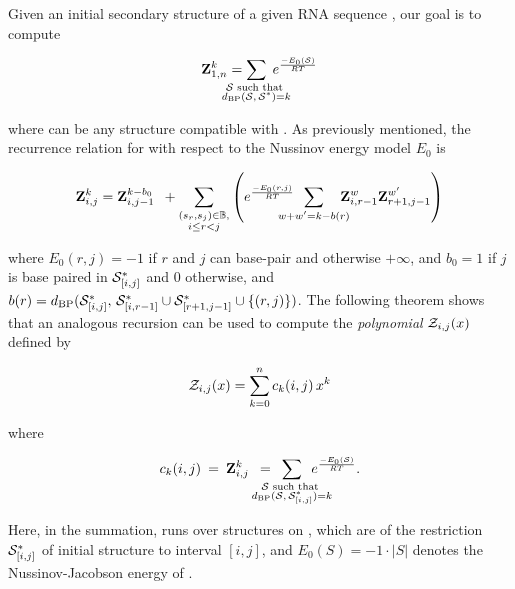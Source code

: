 Given an initial secondary structure \strSt of a
given RNA sequence \seq, our goal is to compute

\begin{align}
\label{eq:fftbor:defZofK}
\bfZ{k}{1,n} = \sum_{\mathclap{\substack{\str \text{ such that }\\ \dBP{\str}{\strSt}=k}}}\;
\boltzNuss{\str}
\end{align}

where \str can be any structure compatible with \seq.
As previously mentioned, the recurrence relation for \rnabor
with respect to the Nussinov energy model $E_0$ is

\begin{align}
\label{eq:fftbor:rnaborNuss}
\bfZ{k}{i,j} = \bfZ{k-b_0}{i,j-1}\enspace +
\sum_{\substack{(s_r,s_j) \in \bpSet, \\ i \le r<j}}
\left(
\boltzNuss{r,j}\enspace \sum_{\mathclap{w+w'=k-b(r)}}\quad
\bfZ{w}{i,r-1} \bfZ{w'}{r+1,j-1}
\right)
\end{align}

where $E_0(r,j)=-1$ if $r$ and $j$ can base-pair and otherwise
$+\infty$, and
$b_0 = 1$ if $j$ is base paired in $\mathcal S^*_{[i,j]}$ and 0 otherwise, and
$b(r)=d_{\text{BP}}(\mathcal S^*_{[i,j]},\,\mathcal S^*_{[i,r-1]} \cup \mathcal S^*_{[r+1,j-1]} \cup\{(r,j)\})$.
The following theorem shows that an analogous recursion can be used to compute
the {\em polynomial} ${\mathcal Z}_{i,j}(x)$ defined by

\begin{align}
\label{eq:fftbor:polynomialZij}
\emZ{i,j} = \sum_{k=0}^n c_k(i,j)\,x^k
\end{align}

where

\begin{align}
c_k(i,j)\>=\>
\bfZ{k}{i,j}\enspace=\enspace
\sum_{\mathclap{\substack{\str \text{ such that } \\
\dBP{\str}{\strSt_{[i,j]}}=k}}}\enspace
\boltzNuss{\str}.
\end{align}

Here, in the summation, \str runs over structures on \seqIJ, which
are \kNbrs of the restriction $\mathcal S^*_{[i,j]}$ of initial structure
\strSt to interval $[i,j]$, and
$E_0(S)=-1 \cdot |S|$ denotes the Nussinov-Jacobson energy of \str.

